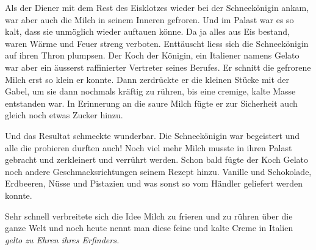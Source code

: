 Als der Diener mit dem Rest des Eisklotzes wieder bei der Schneekönigin ankam, war aber auch die Milch in seinem Inneren gefroren. Und im Palast war es so kalt, dass sie unmöglich wieder auftauen könne. Da ja alles aus Eis bestand, waren Wärme und Feuer streng verboten. Enttäuscht liess sich die Schneekönigin auf ihren Thron plumpsen. Der Koch der Königin, ein Italiener namens Gelato war aber ein äusserst raffinierter Vertreter seines Berufes. Er schnitt die gefrorene Milch erst so klein er konnte. Dann zerdrückte er die kleinen Stücke mit der Gabel, um sie dann nochmals kräftig zu rühren, bis eine cremige, kalte Masse entstanden war. In Erinnerung an die saure Milch fügte er zur Sicherheit auch gleich noch etwas Zucker hinzu.

Und das Resultat schmeckte wunderbar. Die Schneekönigin war begeistert und alle die probieren durften auch! Noch viel mehr Milch musste in ihren Palast gebracht und zerkleinert und verrührt werden. Schon bald fügte der Koch Gelato noch andere Geschmacksrichtungen seinem Rezept hinzu. Vanille und Schokolade, Erdbeeren, Nüsse und Pistazien und was sonst so vom Händler geliefert werden konnte.

Sehr schnell verbreitete sich die Idee Milch zu frieren und zu rühren über die ganze Welt und noch heute nennt man diese feine und kalte Creme in Italien \itshape{gelto} zu Ehren ihres Erfinders.  \hfill {\color{red}\decofourleft}
